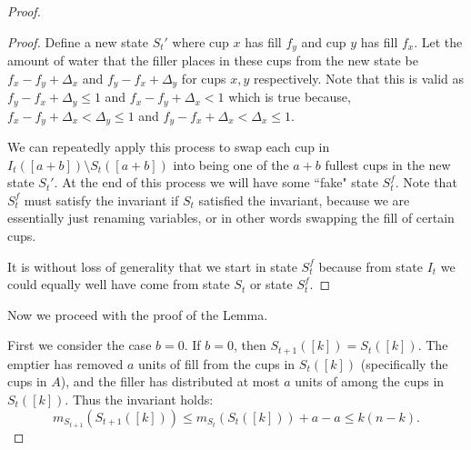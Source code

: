 \documentclass[twocolumn]{article}[10pt]
\begin{document}
\begin{proof}
\begin{proof}
Define a new state $S_t'$ where cup $x$ has fill $f_y$ and cup $y$ has fill $f_x$. 
Let the amount of water that the filler places in these cups from the new state be
$f_x-f_y+\Delta_x$ and $f_y-f_x + \Delta_y$ for cups $x,y$ respectively.
Note that this is valid as $f_y-f_x + \Delta_y\le 1$ and $f_x-f_y+\Delta_x < 1$
which is true because, $f_x-f_y+\Delta_x<\Delta_y \le 1$ and $f_y-f_x + \Delta_x < \Delta_x \le 1$.

We can repeatedly apply this process to swap each cup in $I_t([a+b])\setminus
S_t([a+b])$ into being one of the $a+b$ fullest cups in the new state $S_t'$.
At the end of this process we will have some ``fake" state $S_t^f$. Note that
$S_t^f$ must satisfy the invariant if $S_t$ satisfied the invariant, because we
are essentially just renaming variables, or in other words swapping the fill of
certain cups.

It is without loss of generality that we start in state $S_t^f$ because from
state $I_t$ we could equally well have come from state $S_t$ or state $S_t^f$.
\end{proof}

Now we proceed with the proof of the Lemma.

First we consider the case $b=0$. If $b=0$, then $S_{t+1}([k]) = S_t([k])$. 
The emptier has removed $a$ units of fill from the cups in $S_t([k])$
(specifically the cups in $A$), and the filler has distributed at most $a$
units of among the cups in $S_t([k])$. Thus the invariant holds:
$$m_{S_{t+1}}(S_{t+1}([k])) \le m_{S_t}(S_t([k]))+a-a \le k(n-k).$$


\end{proof}
\end{document}
